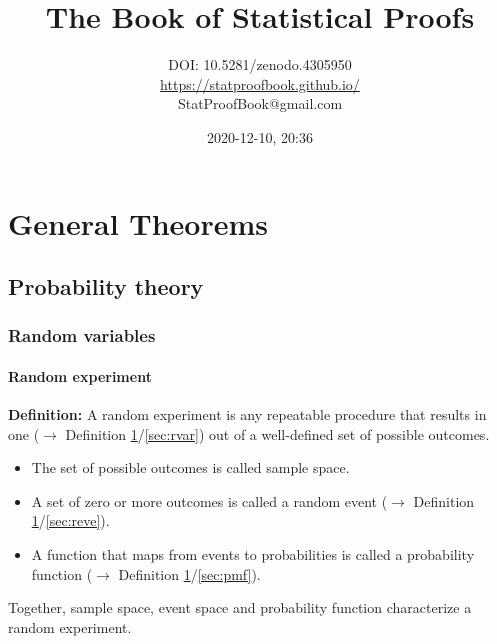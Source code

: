 \documentclass[a4paper,12pt,twoside]{book}
\title{\Huge{The Book of Statistical Proofs}}
\author{DOI: 10.5281/zenodo.4305950 \\ \url{https://statproofbook.github.io/} \\ StatProofBook@gmail.com}
\date{2020-12-10, 20:36}
\begin{document}
\maketitle

\pagebreak
{}
\tableofcontents

\newpage
{}


\chapter{General Theorems} \label{sec:General Theorems} \newpage

\pagebreak
\section{Probability theory}

\subsection{Random variables}

\subsubsection[\textit{Random experiment}]{Random experiment} \label{sec:rexp}
\setcounter{equation}{0}

\textbf{Definition:} A random experiment is any repeatable procedure that results in one ($\rightarrow$ Definition \ref{sec:General Theorems}/\ref{sec:rvar}) out of a well-defined set of possible outcomes.

\begin{itemize}

\item The set of possible outcomes is called sample space.

\item A set of zero or more outcomes is called a random event ($\rightarrow$ Definition \ref{sec:General Theorems}/\ref{sec:reve}).

\item A function that maps from events to probabilities is called a probability function ($\rightarrow$ Definition \ref{sec:General Theorems}/\ref{sec:pmf}).

\end{itemize}

Together, sample space, event space and probability function characterize a random experiment.
\end{document}
